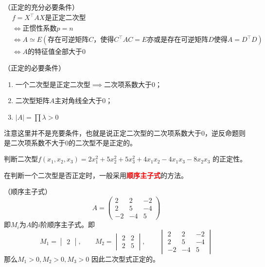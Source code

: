 \begin{theorem}
    （正定的充分必要条件）
    \begin{align*}
         & f=X^\intercal AX\text{是正定二次型}                                                                                    \\
         & \iff \text{正惯性系数}p=n                                                                                              \\
         & \iff A\simeq E (\text{存在可逆矩阵}C\text{，使得}C^\intercal AC=E\text{亦或是存在可逆矩阵}D\text{使得}A=D^\intercal D) \\
         & \iff A\text{的特征值全部大于}0
    \end{align*}
\end{theorem}

\begin{theorem}
    （正定的必要条件）
    \begin{enumerate}
        \item 一个二次型是正定二次型$\implies$二次项系数大于$0$；
        \item 二次型矩阵$A$主对角线全大于$0$；
        \item $|A| = \prod \lambda > 0$
    \end{enumerate}
\end{theorem}
注意这里并不是充要条件，也就是说正定二次型的二次项系数大于$0$，逆反命题则是二次项系数不大于$0$的二次型不是正定的。

\begin{example}
    判断二次型$f(x_1,x_2,x_3)=2x_1^2 + 5x_2^2 + 5x_3^2 + 4x_1x_2 - 4x_1x_3 - 8x_2x_3$
    的正定性。
\end{example}
在判断一个二次型是否正定时，一般采用\textcolor{red}{\textbf{\textsf{顺序主子式}}}的方法。
\begin{solution}
    （顺序主子式）
    \[
        A =
        \begin{pmatrix}
            2  & 2  & -2 \\
            2  & 5  & -4 \\
            -2 & -4 & 5
        \end{pmatrix}
    \]
    即$M_i$为$A$的$i$阶顺序主子式。即
    \[
        M_1 =
        \begin{vmatrix}
            2
        \end{vmatrix},\qquad
        M_2 =
        \begin{vmatrix}
            2 & 2 \\
            2 & 5
        \end{vmatrix},\qquad
        \begin{vmatrix}
            2  & 2  & -2 \\
            2  & 5  & -4 \\
            -2 & -4 & 5
        \end{vmatrix}
    \]
    那么$M_1 > 0, M_2>0, M_3>0$
    因此二次型式正定的。
\end{solution}

